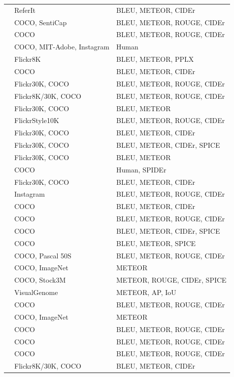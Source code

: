 \begin{table}[hpt]
\begin{longtable}{p{50mm} | p{50mm} | p{60mm} }
        \citet{Mao2016} & ReferIt & BLEU, METEOR, CIDEr \\
        \citet{Mathews2016} & COCO, SentiCap & BLEU, METEOR, ROUGE, CIDEr \\
        \citet{Sugano2016} & COCO & BLEU, METEOR, ROUGE, CIDEr \\
        \citet{Tran2016} & COCO, MIT-Adobe, Instagram &  Human\\
        \citet{Wang2016} & Flickr8K & BLEU, METEOR, PPLX \\
        \citet{Yang2016} & COCO & BLEU, METEOR, CIDEr \\
        \citet{You2016} & Flickr30K, COCO & BLEU, METEOR, ROUGE, CIDEr \\
        \citet{Chen2017} & Flickr8K/30K, COCO & BLEU, METEOR, ROUGE, CIDEr \\
        \citet{Dai2017} & Flickr30K, COCO & BLEU, METEOR \\
        \citet{Gan2017a} & FlickrStyle10K & BLEU, METEOR, ROUGE, CIDEr \\
        \citet{Gan2017b} & Flickr30K, COCO &  BLEU, METEOR, CIDEr \\
        \citet{Gu2017} & Flickr30K, COCO & BLEU, METEOR, CIDEr, SPICE \\
        \citet{Liu2017a} & Flickr30K, COCO & BLEU, METEOR \\
        \citet{Liu2017b} & COCO & Human, SPIDEr \\
        \citet{Lu2017} & Flickr30K, COCO & BLEU, METEOR, CIDEr \\
        \citet{Park2017} & Instagram & BLEU, METEOR, ROUGE, CIDEr \\
        \citet{Pedersoli2017} & COCO & BLEU, METEOR, CIDEr \\
        \citet{Ren2017} & COCO & BLEU, METEOR, ROUGE, CIDEr \\
        \citet{Rennie2017} & COCO & BLEU, METEOR, CIDEr, SPICE \\
        \citet{Shetty2017} & COCO & BLEU, METEOR, SPICE \\
        \citet{Tavakoliy2017} & COCO, Pascal 50S & BLEU, METEOR, ROUGE, CIDEr \\
        \citet{Venugopalan2017} & COCO, ImageNet & METEOR \\
        \citet{Wang2017} & COCO, Stock3M & METEOR, ROUGE, CIDEr, SPICE \\
        \citet{Yang2017} & VisualGenome & METEOR, AP, IoU \\
        \citet{Yao2017a} & COCO & BLEU, METEOR, ROUGE, CIDEr \\
        \citet{Yao2017b} & COCO, ImageNet & METEOR \\
        \citet{Zhang2017} & COCO & BLEU, METEOR, ROUGE, CIDEr \\
        \citet{Aneja2018} & COCO & BLEU, METEOR, ROUGE, CIDEr \\
        \citet{Wang2018} & COCO & BLEU, METEOR, ROUGE, CIDEr \\
        \citet{Wu2018} & Flickr8K/30K, COCO & BLEU, METEOR, CIDEr \\
        \hline
    \end{longtable}
\end{table}